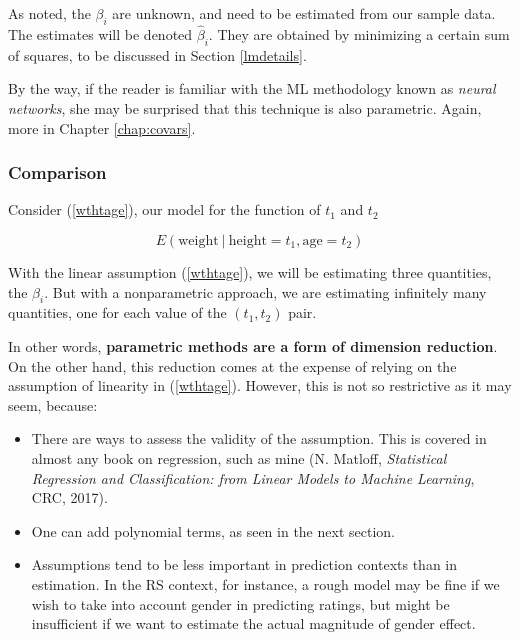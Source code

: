 As noted, the $\beta_i$ are unknown, and need to be estimated
from our sample data.  The estimates will be denoted
$\widehat{\beta}_i$.  They are obtained by minimizing a certain sum of
squares, to be discussed in Section \ref{lmdetails}.

By the way, if the reader is familiar with the ML methodology known as
\textit{neural networks}, she may be surprised that this technique is
also parametric.  Again, more in Chapter \ref{chap:covars}.

\subsubsection{Comparison}

Consider (\ref{wthtage}), our model for the function of $t_1$ and $t_2$

\begin{equation}
E(\textrm{weight} ~|~ \textrm{height} = t_1, \textrm{age} = t_2)
\end{equation}


With the linear assumption (\ref{wthtage}), we will be estimating three
quantities, the $\beta_i$.  But with a nonparametric approach, we are
estimating infinitely many quantities, one for each value of the
$(t_1,t_2)$ pair.

In other words, \textbf{parametric methods are a form of dimension reduction}.
On the other hand, this reduction comes at the expense of relying on the
assumption of linearity in (\ref{wthtage}).  However, this is not so
restrictive as it may seem, because:

\begin{itemize}

\item There are ways to assess the validity of the assumption.  This is
covered in almost any book on regression, such as mine
(N. Matloff, \textit{Statistical Regression and Classification: from
Linear Models to Machine Learning}, CRC, 2017).

\item One can add polynomial terms, as seen in the next section.

\item Assumptions tend to be less important in prediction contexts than
in estimation.  In the RS context, for instance, a rough model may be
fine if we wish to take into account gender in predicting ratings, but
might be insufficient if we want to estimate the actual magnitude of
gender effect.

\end{itemize} 

